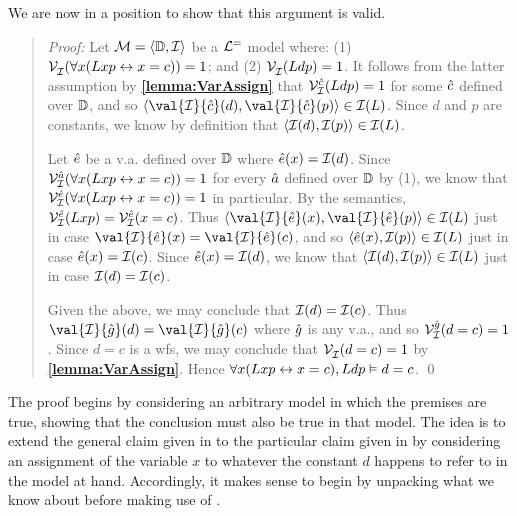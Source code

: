 \begin{multicols}{2}
  \begin{oarg}[\ref{cara}]
  \end{oarg}

  \columnbreak

  \begin{oarg}[\ref{caraF}]
  \end{oarg}
\end{multicols}

We are now in a position to show that this argument is valid.

\begin{quote}
\label{unique1}
  \textit{Proof:}
  Let $\mathcal{M}=\langle\mathbb{D},\mathcal{I}\rangle$ be a $\mathcal{L}^{=}$ model where: (1) $\mathcal{V}_{\mathcal{I}}^{}(\forall x(Lxp \leftrightarrow x=c))=1$; and (2) $\mathcal{V}_{\mathcal{I}}^{}(Ldp)=1$.
  It follows from the latter assumption by \textbf{\ref{lemma:VarAssign}} that $\mathcal{V}_{\mathcal{I}}^{\hat{c}}(Ldp)=1$ for some $\hat{c}$ defined over $\mathbb{D}$, and so $\tuple{\val{\I}{\va{c}}(d),\val{\I}{\va{c}}(p)}\in\I(L)$.
  Since $d$ and $p$ are constants, we know by definition that $\langle\mathcal{I}(d),\mathcal{I}(p)\rangle\in\mathcal{I}(L)$.

  Let $\hat{e}$ be a v.a. defined over $\mathbb{D}$ where $\hat{e}(x)=\mathcal{I}(d)$.
  Since $\mathcal{V}_{\mathcal{I}}^{\hat{a}}(\forall x(Lxp \leftrightarrow x=c))=1$ for every $\hat{a}$ defined over $\mathbb{D}$ by (1), we know that $\mathcal{V}_{\mathcal{I}}^{\hat{e}}(\forall x(Lxp \leftrightarrow x=c))=1$ in particular.
  By the semantics, $\mathcal{V}_{\mathcal{I}}^{\hat{e}}(Lxp)=\mathcal{V}_{\mathcal{I}}^{\hat{e}}(x=c)$.
  Thus $\tuple{\val{\I}{\va{e}}(x),\val{\I}{\va{e}}(p)}\in\I(L)$ just in case $\val{\I}{\va{e}}(x)=\val{\I}{\va{e}}(c)$, and so $\langle\hat{e}(x),\mathcal{I}(p)\rangle\in\mathcal{I}(L)$ just in case $\hat{e}(x)=\mathcal{I}(c)$.
  Since $\hat{e}(x)=\mathcal{I}(d)$, we know that $\langle\mathcal{I}(d),\mathcal{I}(p)\rangle\in\mathcal{I}(L)$ just in case $\mathcal{I}(d)=\mathcal{I}(c)$.

  Given the above, we may conclude that $\mathcal{I}(d)=\mathcal{I}(c)$.
  Thus $\val{\I}{\va{g}}(d)=\val{\I}{\va{g}}(c)$ where $\hat{g}$ is any v.a., and so $\mathcal{V}_{\mathcal{I}}^{\hat{g}}(d=c)=1$.
  Since $d=c$ is a wfs, we may conclude that $\mathcal{V}_{\mathcal{I}}^{}(d=c)=1$ by \textbf{\ref{lemma:VarAssign}}. 
  Hence $\forall x(Lxp \leftrightarrow x=c), Ldp \vDash d=c$. 
  \qed
\end{quote}

The proof begins by considering an arbitrary model in which the premises are true, showing that the conclusion must also be true in that model.
The idea is to extend the general claim given in  to the particular claim given in  by considering an assignment of the variable $x$ to whatever the constant $d$ happens to refer to in the model at hand.
Accordingly, it makes sense to begin by unpacking what we know about  before making use of .


